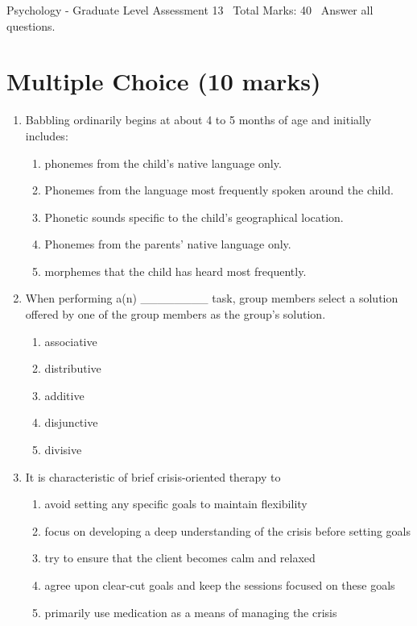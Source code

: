 \documentclass[12pt]{article}
\begin{document}
\begin{center}
Psychology - Graduate Level Assessment 13 \
Total Marks: 40 \
Answer all questions.
\end{center}

\section*{Multiple Choice (10 marks)}
\begin{enumerate}[label=\arabic*.]
\item Babbling ordinarily begins at about 4 to 5 months of age and initially includes:
\begin{enumerate}[label=(\alph*)]
    \item phonemes from the child's native language only.
    \item Phonemes from the language most frequently spoken around the child.
    \item Phonetic sounds specific to the child's geographical location.
    \item Phonemes from the parents' native language only.
    \item morphemes that the child has heard most frequently.
\end{enumerate}
\item When performing a(n) \_\_\_\_\_\_\_\_ task, group members select a solution offered by one of the group members as the group's solution.
\begin{enumerate}[label=(\alph*)]
    \item associative
    \item distributive
    \item additive
    \item disjunctive
    \item divisive
\end{enumerate}
\item It is characteristic of brief crisis-oriented therapy to
\begin{enumerate}[label=(\alph*)]
    \item avoid setting any specific goals to maintain flexibility
    \item focus on developing a deep understanding of the crisis before setting goals
    \item try to ensure that the client becomes calm and relaxed
    \item agree upon clear-cut goals and keep the sessions focused on these goals
    \item primarily use medication as a means of managing the crisis

\end{enumerate}
\end{enumerate}
\end{document}
